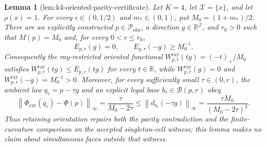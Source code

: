 \documentclass{article}
\newtheorem{lemma}{Lemma}
\begin{document}
\begin{lemma}[lem:k4-oriented-parity-certificate]\label{lem:k4-oriented-parity-certificate}
Let \(K=4\), let \(\mathcal X=\{x\}\), and let \(\rho(x)=1\).  For every \(\epsilon\in(0,1/2)\) and \(m_*\in(0,1)\), put \(M_0=(1+m_*)/2\).  There are an explicitly constructed \(p\in\mathcal P_{\mathrm{obs}}\), a direction \(g\in\mathbb R^{\mathcal J}\), and \(r_0>0\) such that \(M(p)=M_0\) and, for every \(0<r\le r_0\),
\[
 E_{p,r}(g)=0,
 \qquad
 E_{p,r}(-g)\ge M_0^{-1}.
\]
Consequently the ray-restricted oriented functional \(W^{\mathrm{ray}}_{p,r}(tg)=(-t)_+/M_0\) satisfies \(W^{\mathrm{ray}}_{p,r}(tg)\le E_{p,r}(tg)\) for every \(t\in\mathbb R\), while \(W^{\mathrm{ray}}_{p,r}(g)=0\) and \(W^{\mathrm{ray}}_{p,r}(-g)=M_0^{-1}>0\).  Moreover, for every sufficiently small \(\tau\in(0,r)\), the ambient law \(q_\tau=p-\tau g\) and an explicit legal base \(b_\tau\in\mathcal B(p,r)\) obey
\[
 \left\|\Phi_{\mathrm{ext}}(q_\tau)-\Phi(p)\right\|_\infty
 =\frac{\tau}{M_0-2\tau}
 \le \left\|d_{b_\tau}(-\tau g)\right\|_\infty
 =\frac{\tau M_0}{(M_0-2\tau)^2}.
\]
Thus retaining orientation repairs both the parity contradiction and the finite-curvature comparison on the accepted singleton-cell witness; this lemma makes no claim about simultaneous faces outside that witness.
\end{lemma}
\end{document}
